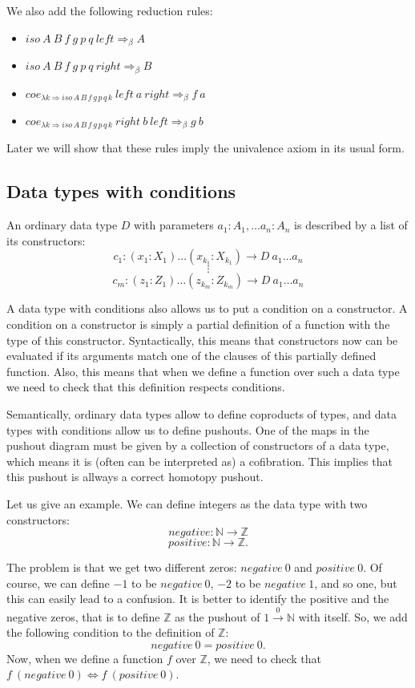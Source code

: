 \documentclass[8pt]{amsart}
\theoremstyle{definition}
\theoremstyle{remark}
\newcommand{\red}{\Rightarrow}
\newcommand{\deq}{\Leftrightarrow}
\numberwithin{figure}{section}
\begin{document}
We also add the following reduction rules:
\begin{itemize}
\item $iso\ A\ B\ f\ g\ p\ q\ left \red_\beta A$
\item $iso\ A\ B\ f\ g\ p\ q\ right \red_\beta B$
\item $coe_{\lambda k \red iso\,A\,B\,f\,g\,p\,q\,k}\ left\ a\ right \red_\beta f\ a$
\item $coe_{\lambda k \red iso\,A\,B\,f\,g\,p\,q\,k}\ right\ b\ left \red_\beta g\ b$
\end{itemize}

Later we will show that these rules imply the univalence axiom in its usual form.

\subsection{Data types with conditions}

An ordinary data type $D$ with parameters $a_1 : A_1, \ldots a_n : A_n$ is described by a list of its constructors:
\[ c_1 : (x_1 : X_1) \ldots (x_{k_1} : X_{k_1}) \to D\ a_1 \ldots a_n \]
\[ \vdots \]
\[ c_m : (z_1 : Z_1) \ldots (z_{k_m} : Z_{k_m}) \to D\ a_1 \ldots a_n \]

A data type with conditions also allows us to put a condition on a constructor.
A condition on a constructor is simply a partial definition of a function with the type of this constructor.
Syntactically, this means that constructors now can be evaluated if its arguments match one of the clauses of this partially defined function.
Also, this means that when we define a function over such a data type we need to check that this definition respects conditions.

Semantically, ordinary data types allow to define coproducts of types, and data types with conditions allow us to define pushouts.
One of the maps in the pushout diagram must be given by a collection of constructors of a data type, which means it is (often can be interpreted as) a cofibration.
This implies that this pushout is allways a correct homotopy pushout.

Let us give an example. We can define integers as the data type with two constructors:
\[ negative : \mathbb{N} \to \mathbb{Z} \]
\[ positive : \mathbb{N} \to \mathbb{Z}. \]

The problem is that we get two different zeros: $negative\ 0$ and $positive\ 0$.
Of course, we can define $-1$ to be $negative\ 0$, $-2$ to be $negative\ 1$, and so one, but this can easily lead to a confusion.
It is better to identify the positive and the negative zeros, that is to define $\mathbb{Z}$ as the pushout of $1 \overset{0}\to \mathbb{N}$ with itself.
So, we add the following condition to the definition of $\mathbb{Z}$:
\[ negative\ 0 = positive\ 0. \]
Now, when we define a function $f$ over $\mathbb{Z}$, we need to check that $f\ (negative\ 0) \deq f\ (positive\ 0)$.
\end{document}
